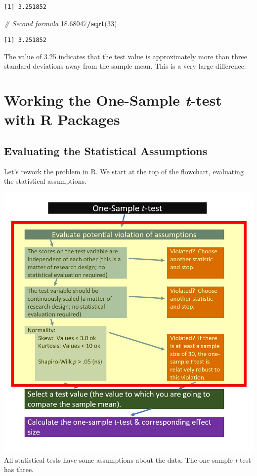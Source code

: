 \documentclass[
  11pt,
]{book}
\newenvironment{Shaded}{\begin{snugshade}}{\end{snugshade}}
\newcommand{\CommentTok}[1]{\textcolor[rgb]{0.37,0.37,0.37}{\textit{#1}}}
\newcommand{\DecValTok}[1]{\textcolor[rgb]{0.06,0.06,0.06}{#1}}
\newcommand{\FloatTok}[1]{\textcolor[rgb]{0.06,0.06,0.06}{#1}}
\newcommand{\FunctionTok}[1]{\textcolor[rgb]{0.27,0.27,0.27}{\textbf{#1}}}
\newcommand{\NormalTok}[1]{#1}
\newcommand{\SpecialCharTok}[1]{\textcolor[rgb]{0.43,0.43,0.43}{\textbf{#1}}}
\begin{document}
\begin{verbatim}
[1] 3.251852
\end{verbatim}

\begin{Shaded}
\begin{Highlighting}[]
\CommentTok{\# Second formula}
\FloatTok{18.68047}\SpecialCharTok{/}\FunctionTok{sqrt}\NormalTok{(}\DecValTok{33}\NormalTok{)}
\end{Highlighting}
\end{Shaded}

\begin{verbatim}
[1] 3.251852
\end{verbatim}

The value of 3.25 indicates that the test value is approximately more than three standard deviations away from the sample mean. This is a very large difference.

\hypertarget{working-the-one-sample-t-test-with-r-packages}{%
\section{\texorpdfstring{Working the One-Sample \emph{t}-test with R Packages}{Working the One-Sample t-test with R Packages}}\label{working-the-one-sample-t-test-with-r-packages}}

\hypertarget{evaluating-the-statistical-assumptions}{%
\subsection{Evaluating the Statistical Assumptions}\label{evaluating-the-statistical-assumptions}}

Let's rework the problem in R. We start at the top of the flowchart, evaluating the statistical assumptions.

\includegraphics{images/ttests/OneSampleAssmptns.jpg} All statistical tests have some assumptions about the data. The one-sample \emph{t}-test has three.
\end{document}
